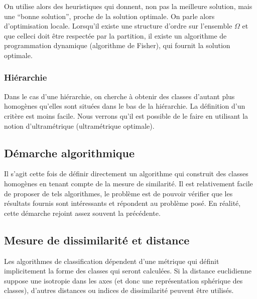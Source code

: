 \documentclass[letterpaper,10pt,english]{jupyterBook}
\begin{document}
\sphinxAtStartPar
On utilise alors des heuristiques qui donnent, non pas la meilleure solution, mais une “bonne solution”, proche de la solution optimale. On parle alors d’optimisation locale. Lorsqu’il existe une structure d’ordre sur l’ensemble  \(\Omega\) et que celle\sphinxhyphen{}ci doit être respectée par la partition, il existe un algorithme de programmation dynamique (algorithme de Fisher), qui fournit la solution optimale.


\subsubsection{Hiérarchie}
\label{\detokenize{clustering:hierarchie}}
\sphinxAtStartPar
Dans le cas d’une hiérarchie, on cherche à obtenir des classes d’autant plus homogènes qu’elles sont situées dans le bas de la hiérarchie. La définition d’un critère est moins facile. Nous verrons qu’il est possible de le faire en utilisant la
notion d’ultramétrique (ultramétrique optimale).


\subsection{Démarche algorithmique}
\label{\detokenize{clustering:demarche-algorithmique}}
\sphinxAtStartPar
Il s’agit cette fois de définir directement un algorithme qui construit des classes homogènes en tenant compte de la mesure de similarité. Il est relativement facile de proposer de tels algorithmes, le problème est de pouvoir vérifier que les résultats fournis sont intéressants et répondent au problème posé. En réalité, cette démarche rejoint assez souvent la précédente.


\subsection{Mesure de dissimilarité et distance}
\label{\detokenize{clustering:mesure-de-dissimilarite-et-distance}}
\sphinxAtStartPar
Les algorithmes de classification dépendent d’une métrique qui définit implicitement la forme des classes qui seront calculées. Si la distance euclidienne suppose une isotropie dans les axes (et donc une représentation sphérique des classes), d’autres distances ou indices de dissimilarité peuvent être utilisés.
\end{document}
